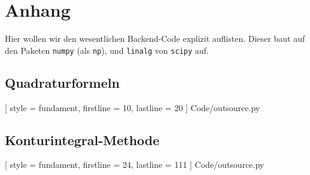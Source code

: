\chapter{Anhang}

Hier wollen wir den wesentlichen Backend-Code explizit auflisten.
Dieser baut auf den Paketen \texttt{numpy} (als \texttt{np}), und \texttt{linalg} von \texttt{scipy} auf.

\section{Quadraturformeln}


[
    style = fundament,
    firstline = 10,
    lastline = 20
]
{Code/outsource.py}

\section{Konturintegral-Methode}


[
    style = fundament,
    firstline = 24,
    lastline = 111
]
{Code/outsource.py}
